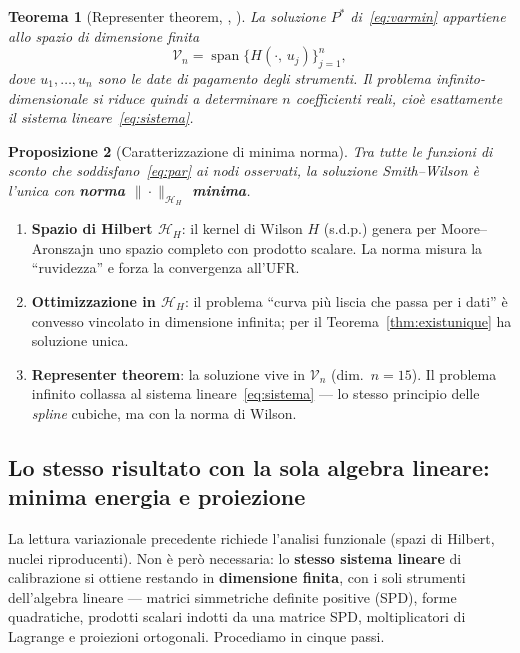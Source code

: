 \documentclass[11pt,a4paper]{article}
\theoremstyle{plain}
\newtheorem{teorema}{Teorema}[section]
\newtheorem{proposizione}[teorema]{Proposizione}
\theoremstyle{definition}
\theoremstyle{remark}
\newcommand{\UFR}{\ensuremath{\mathrm{UFR}}}
\begin{document}
\begin{teorema}[Representer theorem, \cite{wahba1990}, \cite{berlinet2004}]
\label{thm:representer}
La soluzione $P^*$ di~\eqref{eq:varmin} appartiene allo spazio di dimensione finita
\[
  \mathcal{V}_n = \operatorname{span}\bigl\{H(\cdot,\,u_j)\bigr\}_{j=1}^{n},
\]
dove $u_1,\dots,u_n$ sono le date di pagamento degli strumenti. Il problema
infinito-dimensionale si riduce quindi a determinare $n$ coefficienti reali, cio\`e
esattamente il sistema lineare~\eqref{eq:sistema}.
\end{teorema}

\begin{proposizione}[Caratterizzazione di minima norma]
\label{prop:minnorm}
Tra tutte le funzioni di sconto che soddisfano~\eqref{eq:par} ai nodi osservati, la
soluzione Smith--Wilson \`e l'unica con \textbf{norma $\|\cdot\|_{\mathcal{H}_H}$ minima}.
\end{proposizione}

\begin{keybox}
\begin{enumerate}
  \item \textbf{Spazio di Hilbert $\mathcal{H}_H$}: il kernel di Wilson $H$ (s.d.p.) genera
        per Moore--Aronszajn uno spazio completo con prodotto scalare. La norma misura
        la ``ruvidezza'' e forza la convergenza all'$\UFR$.
  \item \textbf{Ottimizzazione in $\mathcal{H}_H$}: il problema ``curva pi\`u liscia che
        passa per i dati'' \`e convesso vincolato in dimensione infinita; per il
        Teorema~\ref{thm:existunique} ha soluzione unica.
  \item \textbf{Representer theorem}: la soluzione vive in $\mathcal{V}_n$ (dim.\ $n=15$).
        Il problema infinito collassa al sistema lineare~\eqref{eq:sistema} --- lo stesso
        principio delle \emph{spline} cubiche, ma con la norma di Wilson.
\end{enumerate}
\end{keybox}

\subsection{Lo stesso risultato con la sola algebra lineare: minima energia e proiezione}

La lettura variazionale precedente richiede l'analisi funzionale (spazi di Hilbert,
nuclei riproducenti). Non \`e per\`o necessaria: lo \textbf{stesso sistema lineare} di
calibrazione si ottiene restando in \textbf{dimensione finita}, con i soli strumenti
dell'algebra lineare --- matrici simmetriche definite positive (SPD), forme quadratiche,
prodotti scalari indotti da una matrice SPD, moltiplicatori di Lagrange e proiezioni
ortogonali. Procediamo in cinque passi.
\end{document}
